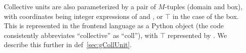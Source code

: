 
Collective units are also parameterized by a pair of $M$-tuples (domain and box), with coordinates being integer expressions of  and , or $\top$ in the case of the box.
This is represented in the frontend language as a Python  object (the code consistently abbreviates ``collective'' as ``coll''), with $\top$ represented by .
We describe this further in def~\ref{sec:gCollUnit}.
